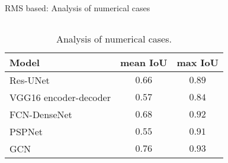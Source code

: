 \documentclass[10pt,aspectratio=169,dvipsnames]{beamer} %
\begin{document}
\begin{frame}{RMS based: Analysis of numerical cases}
\begin{columns}[T]
		\begin{column}[c]{0.9\textwidth}
			\begin{table}[ht!]
				\centering
				\caption{Analysis of numerical cases.}
				\label{tab:table_all_numerical_cases}	
				\begin{tabular}{lcc}
					\toprule[1.5pt]
					Model & mean IoU & max IoU \\ 
					\midrule 
					Res-UNet & \(0.66\) & \(0.89\) \\ 
					VGG16 encoder-decoder & \(0.57\) & \(0.84\) \\ 
					FCN-DenseNet & \(0.68\) & \(0.92\) \\ 
					PSPNet & \(0.55\) & \(0.91\) \\ 
					GCN & \(0.76\) & \(0.93\) \\ 
					\bottomrule[1.5pt]
				\end{tabular}
			\end{table}
		\end{column}
		\end{columns}
	\end{frame}
\end{document}
